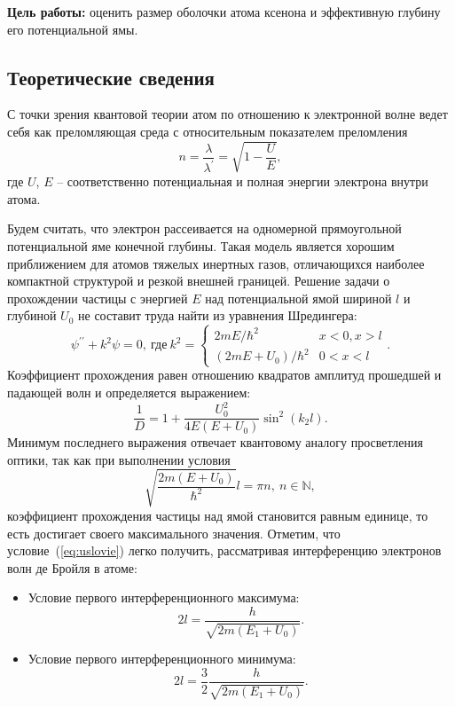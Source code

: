 \documentclass[12pt,a4paper]{article}
\begin{document}
\textbf{Цель работы:} оценить размер оболочки атома ксенона и эффективную глубину его потенциальной ямы.

\subsection{Теоретические сведения}

С точки зрения квантовой теории атом по отношению к электронной волне ведет себя как преломляющая среда с относительным показателем преломления
	\begin{equation*}
		n = \frac{\lambda}{\lambda^\prime} = \sqrt{1-\frac{U}{E}},
	\end{equation*}
	где $U$, $E$ -- соответственно потенциальная и полная энергии электрона внутри атома.
	
	Будем считать, что электрон рассеивается на одномерной прямоугольной потенциальной яме конечной глубины. Такая модель является хорошим приближением для атомов тяжелых инертных газов, отличающихся наиболее компактной структурой и резкой внешней границей. Решение задачи о прохождении частицы с энергией $E$ над потенциальной ямой шириной $l$ и глубиной $U_0$ не составит труда найти из уравнения Шредингера:\\
	\begin{equation*}
		\psi^{\prime\prime}+k^2\psi=0, \ \text{где}\
		k^2 =\begin{cases}
			2mE/\hbar^2 & x<0, x>l\\
			(2mE+U_0)/\hbar^2 & 0<x<l
		\end{cases}.
	\end{equation*}
	Коэффициент прохождения равен отношению квадратов амплитуд прошедшей и падающей волн и определяется выражением:
	\begin{equation*}
		\frac{1}{D} = 1 + \frac{U_0^2}{4E(E+U_0)}\sin^2(k_2l).
	\end{equation*}
	Минимум последнего выражения отвечает квантовому аналогу просветления оптики, так как при выполнении условия
	\begin{equation*}
		\tag{$\star$}
		\label{eq:uslovie}
		\sqrt{\frac{2m(E+U_0)}{\hbar^2}}l = \pi n, \ n\in\mathbb{N},
	\end{equation*}
	коэффициент прохождения частицы над ямой становится равным единице, то есть достигает своего максимального значения.
	Отметим, что условие~(\ref{eq:uslovie}) легко получить, рассматривая интерференцию электронов волн де Бройля в атоме:\\
	\begin{itemize}
		\item
			Условие первого интерференционного максимума:
			\begin{equation}
				\label{eq:1}
				2l = \frac{h}{\sqrt{2m(E_1+U_0)}}.
			\end{equation}
		\item
			Условие первого интерференционного минимума:
			\begin{equation}
				\label{eq:2}
				2l =\frac{3}{2} \frac{h}{\sqrt{2m(E_1+U_0)}}.
			\end{equation}			
	\end{itemize}
\end{document}
